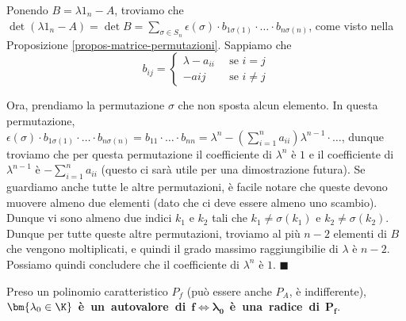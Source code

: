 \documentclass[11pt, a4paper, titlepage, oneside]{scrbook}
\begin{document}
\Dimostrazione \nopagebreak

Ponendo $B = \lambda 1_n - A$, troviamo che $\det (\lambda 1_n - A) = \det B = \sum_{\sigma \in S_n}\epsilon(\sigma) \cdot b_{1\sigma(1)} \cdot \ldots \cdot b_{n\sigma(n)}$, come visto nella Proposizione \ref{propos-matrice-permutazioni}. Sappiamo che 
\[
b_{ij}=
\begin{cases}
\lambda - a_{ii} & \enspace \text{se } i = j \\
-a{ij} & \enspace \text{se } i \neq j 
\end{cases}
\]

Ora, prendiamo la permutazione $\sigma$ che non sposta alcun elemento. In questa permutazione, \mbox{$\epsilon(\sigma) \cdot b_{1\sigma(1)} \cdot \ldots \cdot b_{n\sigma(n)} = b_{11} \cdot \ldots \cdot b_{nn} = \lambda^n - (\sum_{i = 1}^n a_{ii})\lambda^{n-1} \cdot \ldots$}, dunque troviamo che per questa permutazione il coefficiente di $\lambda^n$ è $1$ e il coefficiente di $\lambda^{n-1}$ è $-\sum_{i = 1}^n a_{ii}$ (questo ci sarà utile per una dimostrazione futura). Se guardiamo anche tutte le altre permutazioni, è facile notare che queste devono muovere almeno due elementi (dato che ci deve essere almeno uno scambio). Dunque vi sono almeno due indici $k_1$ e $k_2$ tali che $k_1 \neq \sigma(k_1)$ e $k_2 \neq \sigma(k_2)$. Dunque per tutte queste altre permutazioni, troviamo al più $n-2$ elementi di $B$ che vengono moltiplicati, e quindi il grado massimo raggiungibilie di $\lambda$ è $n-2$. Possiamo quindi concludere che il coefficiente di $\lambda^n$ è $1$. $\blacksquare$

\begin{Proposizione}[]
\label{propos-polinomio-autovalori-radici}
Preso un polinomio caratteristico $P_f$ (può essere anche $P_A$, è indifferente), \mbox{$\bm{\lambda_0 \in \K}$ \textbf{è un autovalore di} $\bm{f} \iff \bm{\lambda_0}$ \textbf{è una radice di} $\bm{P_f}$.}
\end{Proposizione}

\vspace{2cm}

\Dimostrazione \nopagebreak
\end{document}
